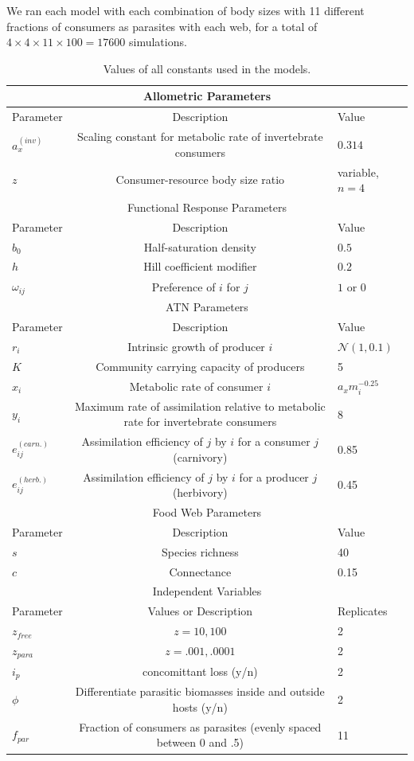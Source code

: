 \documentclass[11pt]{amsart}
\begin{document}
We ran each model with each combination of body sizes with 11 different fractions of consumers as parasites with each web, for a total of $4\times4\times11\times 100 =17600$ simulations. 

\begin{table}
\begin{tabular}{|l|c|l|}
\hline
\multicolumn{3}{|c|}{Allometric Parameters}\\
\hline
Parameter&Description&Value\\
\hline
$a_x^{(inv)}$&Scaling constant for metabolic rate of invertebrate consumers & $0.314$\\
$z$&Consumer-resource body size ratio&variable, $n=4$\\
\hline
\hline
\multicolumn{3}{|c|}{Functional Response Parameters}\\
\hline
Parameter&Description&Value\\
\hline
$b_0$&Half-saturation density&$0.5$\\
$h$&Hill coefficient modifier& $0.2$\\
$\omega_{ij}$&Preference of $i$ for $j$&$1$ or $0$\\
\hline
\hline
\multicolumn{3}{|c|}{ATN Parameters}\\
\hline
Parameter&Description&Value\\
\hline
$r_i$&Intrinsic growth of producer $i$&$\mathcal{N}(1,0.1)$\\
$K$&Community carrying capacity of producers &5\\
$x_i$&Metabolic rate of consumer $i$&$a_x m_i^{-0.25}$\\
$y_i$&Maximum rate of assimilation relative to metabolic rate for invertebrate consumers & 8\\
$e_{ij}^{(carn.)}$&Assimilation efficiency of $j$ by $i$ for a consumer $j$ (carnivory) & 0.85\\
$e_{ij}^{(herb.)}$&Assimilation efficiency of $j$ by $i$ for a producer $j$ (herbivory) & 0.45\\
\hline
\hline
\multicolumn{3}{|c|}{Food Web Parameters}\\
\hline
Parameter&Description&Value\\
\hline
$s$&Species richness&40\\
$c$&Connectance & 0.15\\
\hline
\hline
\multicolumn{3}{|c|}{Independent Variables}\\
\hline
Parameter & Values or Description & Replicates\\
$z_{free}$&$z=10,100$&2\\
$z_{para}$&$z=.001,.0001$&2\\
$i_p$&concomittant loss (y/n)&2\\
$\phi$&Differentiate parasitic biomasses inside and outside hosts (y/n)&2\\
$f_{par}$&Fraction of consumers as parasites (evenly spaced between 0 and .5)&11\\
\hline
\end{tabular}
\caption{Values of all constants used in the models.  \label{tab:param}}
\end{table}

{}

\end{document}
